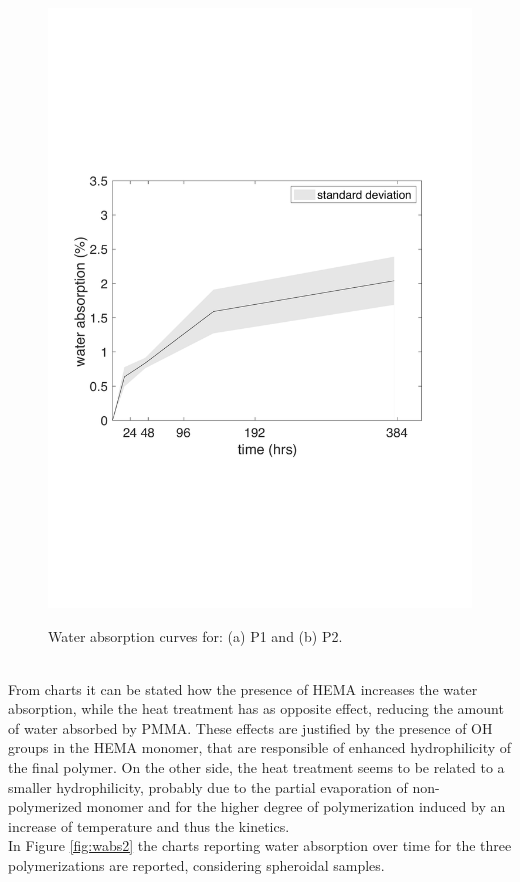 \documentclass[a4paper, 11pt]{article}
\begin{document}
\begin{figure}[htp]
{\includegraphics[scale=0.35]{wabs2}}
\captionsetup{justification=centering}
\caption{Water absorption curves for: (a) P1 and (b) P2.}
\label{fig:wabs1}
\end{figure}\\
From charts it can be stated how the presence of HEMA increases the water absorption, while the heat treatment has as opposite effect, reducing the amount of water absorbed by PMMA. These effects are justified by the presence of OH groups in the HEMA monomer, that are responsible of enhanced hydrophilicity of the final polymer. On the other side, the heat treatment seems to be related to a smaller hydrophilicity, probably due to the partial evaporation of non-polymerized monomer and for the higher degree of polymerization induced by an increase of temperature and thus the kinetics. \\
In Figure \ref{fig:wabs2} the charts reporting water absorption over time for the three polymerizations are reported, considering spheroidal samples. 
\end{document}
